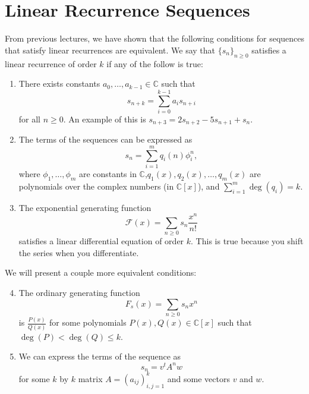 \documentclass[11pt]{article}
\begin{document}
\section{Linear Recurrence Sequences}
From previous lectures, we have shown that the following conditions for sequences that satisfy linear recurrences are equivalent. We say that $\{s_{n}\}_{n\geq 0}$ satisfies a linear recurrence of order $k$ if any of the follow is true:
\begin{enumerate}
\item
There exists constants $a_{0},\ldots,a_{k-1}\in\mathbb{C}$ such that
\begin{equation*}
s_{n+k}=\sum_{i=0}^{k-1}{a_{i}s_{n+i}}
\end{equation*}
for all $n\geq 0$. An example of this is $s_{n+3}=2s_{n+2}-5s_{n+1}+s_{n}$. 
\item
The terms of the sequences can be expressed as
\begin{equation*}
s_{n}=\sum_{i=1}^{m}{q_{i}(n)\phi_{i}^{n}},
\end{equation*}
where $\phi_{1},\ldots,\phi_{m}$ are constants in $\mathbb{C}$,$q_{1}(x),q_{2}(x),\ldots,q_{m}(x)$ are polynomials over the complex numbers (in $\mathbb{C}[x]$), and $\displaystyle\sum_{i=1}^{m}{\deg(q_{i})}=k$.
\item
The exponential generating function
\begin{equation*}
\mathcal{F}(x)=\sum_{n\geq 0}{s_{n}\frac{x^{n}}{n!}}
\end{equation*}
satisfies a linear differential equation of order $k$. This is true because you shift the series when you differentiate. 
\end{enumerate}
We will present a couple more equivalent conditions:
\begin{enumerate}
\setcounter{enumi}{3}
\item
The ordinary generating function 
\begin{equation*}
F_{s}(x)=\sum_{n\geq 0}{s_{n}x^{n}}
\end{equation*}
is $\frac{P(x)}{Q(x)}$ for some polynomials $P(x),Q(x)\in\mathbb{C}[x]$ such that $\deg(P)<\deg(Q)\leq k$.
\item
We can express the terms of the sequence as 
\begin{equation*}
s_{n}=v^{t}A^{n}w
\end{equation*}
for some $k$ by $k$ matrix $A=(a_{ij})_{i,j=1}^{k}$ and some vectors $v$ and $w$. 
\end{enumerate}
\end{document}
